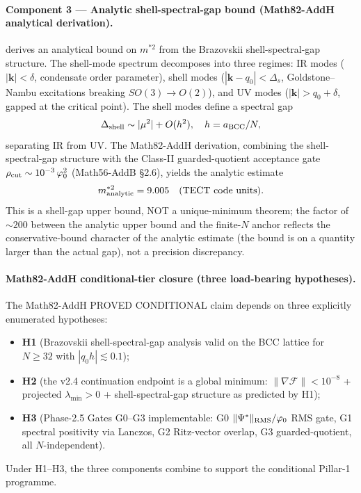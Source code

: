\paragraph{Component 3 — Analytic shell-spectral-gap bound
(Math82-AddH analytical derivation).}
\cite{Math82AddH} derives an analytical bound on $m^{*2}$ from the
Brazovskii shell-spectral-gap structure. The shell-mode spectrum
decomposes into three regimes: IR modes ($|\mathbf{k}| < \delta$,
condensate order parameter), shell modes ($|\mathbf{k} - q_0| <
\Delta_s$, Goldstone--Nambu excitations breaking $SO(3) \to O(2)$),
and UV modes ($|\mathbf{k}| > q_0 + \delta$, gapped at the critical
point). The shell modes define a spectral gap
\[
\Delta_{\rm shell} \sim |\mu^2| + O(h^2), \quad h = a_{\rm BCC}/N,
\]
separating IR from UV. The Math82-AddH derivation, combining the
shell-spectral-gap structure with the Class-II guarded-quotient
acceptance gate $\rho_{\rm cut} \sim 10^{-3}\, \varphi_0^2$
(Math56-AddB \S 2.6), yields the analytic estimate
\[
m^{*2}_{\rm analytic} = 9.005 \quad \text{(TECT code units)}.
\]
This is a shell-gap upper bound, NOT a unique-minimum theorem; the
factor of $\sim 200$ between the analytic upper bound and the
finite-$N$ anchor reflects the conservative-bound character of the
analytic estimate (the bound is on a quantity larger than the
actual gap), not a precision discrepancy.

\paragraph{Math82-AddH conditional-tier closure (three load-bearing
hypotheses).}
The Math82-AddH PROVED CONDITIONAL claim depends on three
explicitly enumerated hypotheses:
\begin{itemize}
\item \textbf{H1} (Brazovskii shell-spectral-gap analysis valid on
the BCC lattice for $N \geq 32$ with $|q_0 h| \lesssim 0.1$);
\item \textbf{H2} (the v2.4 continuation endpoint is a global
minimum: $\|\nabla\mathcal{F}\| < 10^{-8}$ + projected
$\lambda_{\min} > 0$ + shell-spectral-gap structure as predicted by
H1);
\item \textbf{H3} (Phase-2.5 Gates G0--G3 implementable: G0
$\|\Psi^*\|_{\rm RMS}/\varphi_0$ RMS gate, G1 spectral positivity
via Lanczos, G2 Ritz-vector overlap, G3 guarded-quotient,
all $N$-independent).
\end{itemize}
Under H1--H3, the three components combine to support the
conditional Pillar-1 programme.

